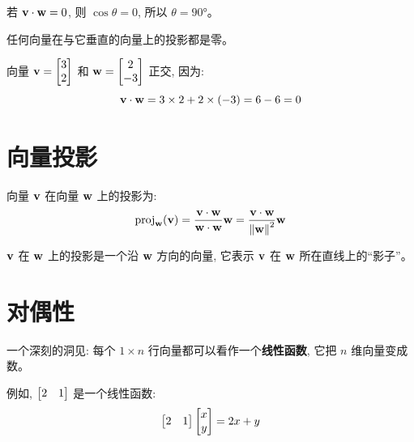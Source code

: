 \begin{intuition}
若 $\mathbf{v} \cdot \mathbf{w} = 0$, 则 $\cos\theta = 0$, 所以 $\theta = 90°$。

任何向量在与它垂直的向量上的投影都是零。
\end{intuition}

\begin{example}
向量 $\mathbf{v} = \begin{bmatrix} 3 \\ 2 \end{bmatrix}$ 和 $\mathbf{w} = \begin{bmatrix} 2 \\ -3 \end{bmatrix}$ 正交, 因为:
\[
\mathbf{v} \cdot \mathbf{w} = 3 \times 2 + 2 \times (-3) = 6 - 6 = 0
\]
\end{example}

\section{向量投影}

\begin{definition}[向量的投影]
向量 $\mathbf{v}$ 在向量 $\mathbf{w}$ 上的投影为:
\[
\operatorname{proj}_{\mathbf{w}}(\mathbf{v}) = \frac{\mathbf{v} \cdot \mathbf{w}}{\mathbf{w} \cdot \mathbf{w}} \mathbf{w} = \frac{\mathbf{v} \cdot \mathbf{w}}{\left\| \mathbf{w} \right\|^2} \mathbf{w}
\]
\end{definition}

\begin{intuition}
$\mathbf{v}$ 在 $\mathbf{w}$ 上的投影是一个沿 $\mathbf{w}$ 方向的向量, 它表示 $\mathbf{v}$ 在 $\mathbf{w}$ 所在直线上的``影子''。
\end{intuition}

\begin{center}
\end{center}

\section{对偶性}

\begin{intuition}
一个深刻的洞见: 每个 $1 \times n$ 行向量都可以看作一个\textbf{线性函数}, 它把 $n$ 维向量变成数。

例如, $\begin{bmatrix}2 & 1\end{bmatrix}$ 是一个线性函数:
\[
\begin{bmatrix}2 & 1\end{bmatrix} \begin{bmatrix} x \\ y \end{bmatrix} = 2x + y
\]
\end{intuition}

